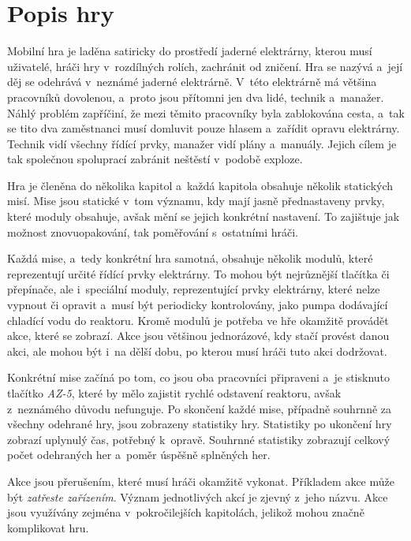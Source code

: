 \section{Popis hry}

Mobilní hra je laděna satiricky do prostředí jaderné elektrárny,
kterou musí uživatelé,
hráči hry v~rozdílných rolích,
zachránit od zničení.
Hra se nazývá \emph{\myAppName}
a~její děj se odehrává v~neznámé jaderné elektrárně.
V~této elektrárně má většina pracovníků dovolenou,
a~proto jsou přítomni jen dva lidé,
technik a~manažer.
Náhlý problém zapříčiní,
že mezi těmito pracovníky byla zablokována cesta,
a~tak se tito dva zaměstnanci musí domluvit pouze hlasem
a~zařídit opravu elektrárny.
Technik vidí všechny řídící prvky,
manažer vidí plány a~manuály.
Jejich cílem je tak společnou spoluprací zabránit neštěstí v~podobě exploze. 

Hra je členěna do několika kapitol
a~každá kapitola obsahuje několik statických misí.
Mise jsou statické v~tom významu,
kdy mají jasně přednastaveny prvky,
které moduly obsahuje,
avšak mění se jejich konkrétní nastavení.
To zajištuje jak možnost znovuopakování,
tak poměřování s~ostatními hráči.

Každá mise,
a~tedy konkrétní hra samotná,
obsahuje několik modulů,
které reprezentují určité řídící prvky elektrárny.
To mohou být nejrůznější tlačítka či přepínače,
ale i~speciální moduly,
reprezentující prvky elektrárny,
které nelze vypnout či opravit a~musí být periodicky kontrolovány,
jako pumpa dodávající chladící vodu do reaktoru.
Kromě modulů je potřeba ve hře okamžitě provádět akce,
které se zobrazí.
Akce jsou většinou jednorázové,
kdy stačí provést danou akci,
ale mohou být i~na dělší dobu,
po kterou musí hráči tuto akci dodržovat.

Konkrétní mise začíná po tom,
co jsou oba pracovníci připraveni
a~je stisknuto tlačítko \emph{AZ-5},
které by mělo zajistit rychlé odstavení reaktoru,
avšak z~neznámého důvodu nefunguje.
Po skončení každé mise,
případně souhrnně za všechny odehrané hry,
jsou zobrazeny statistiky hry.
Statistiky po ukončení hry zobrazí uplynulý čas,
potřebný k~opravě.
Souhrnné statistiky zobrazují
celkový počet odehraných her a~poměr úspěšně splněných her.

Akce jsou přerušením,
které musí hráči okamžitě vykonat.
Příkladem akce může být \emph{zatřeste zařízením}.
Význam jednotlivých akcí je zjevný z~jeho názvu.
Akce jsou využívány zejména v~pokročilejších kapitolách,
jelikož mohou značně komplikovat hru.
